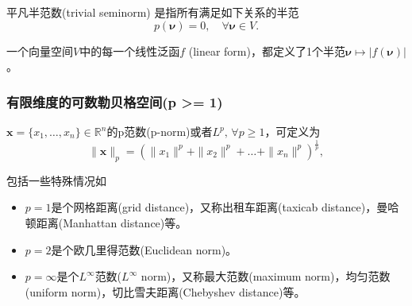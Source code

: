   \begin{definition}[平凡半范]
    平凡半范数(trivial seminorm) 是指所有满足如下关系的半范
    \begin{equation*}
      p(\bm{\nu}) = 0, \quad \forall \bm{\nu} \in V.
    \end{equation*}
  \end{definition}

  一个向量空间$V$中的每一个线性泛函$f$ (linear form)，都定义了1个半范$\bm{\nu} \mapsto | f(\bm{\nu}) |$。

  \subsubsection{有限维度的可数勒贝格空间(p >= 1)}
  $ \bm{x} = \{ x_1, \ldots, x_n \} \in \mathbb{R}^n$的p范数(p-norm)或者$L^p, \, \forall p \ge 1$，可定义为
  \begin{equation*}
    \parallel \bm{x} \parallel_p = \left( \|x_1\|^p + \|x_2\|^p + \ldots + \|x_n\|^p \right)^{\frac{1}{p}},
  \end{equation*}

  包括一些特殊情况如
  \begin{itemize}
    \item $p=1$是个网格距离(grid distance)，又称出租车距离(taxicab distance)，曼哈顿距离(Manhattan distance)等。
    \item $p=2$是个欧几里得范数(Euclidean norm)。
    \item $p=\infty$是个$L^{\infty}$范数($L^{\infty}$ norm)，又称最大范数(maximum norm)，均匀范数(uniform norm)，切比雪夫距离(Chebyshev distance)等。
  \end{itemize}

